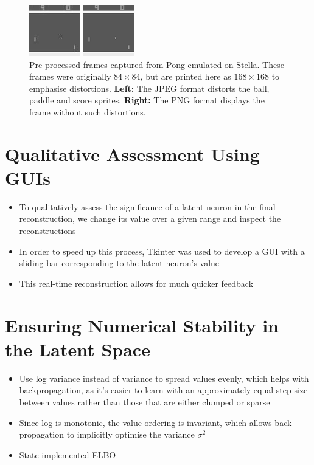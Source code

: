 \begin{figure}[h!]
\centering
\captionsetup{justification=centering}
\begin{multicols}{1}
    \includegraphics[scale=2.0]{figures/related_work/pong_729_pre_processed.jpeg}\par
    \includegraphics[scale=2.0]{figures/related_work/pong_729_pre_processed.png}\par
\end{multicols}
\caption{Pre-processed frames captured from Pong emulated on Stella. These frames were originally $84\times 84$, but are printed here as $168\times 168$ to emphasise distortions. \textbf{Left:} The JPEG format distorts the ball, paddle and score sprites. \textbf{Right:} The PNG format displays the frame without such distortions.}
\label{fig:pong_729_pre_processed}
\end{figure}


%
%
%
%
%
\section{Qualitative Assessment Using GUIs}
\begin{itemize}
\item To qualitatively assess the significance of a latent neuron in the final reconstruction, we change its value over a given range and inspect the reconstructions
\item In order to speed up this process, Tkinter was used to develop a GUI with a sliding bar corresponding to the latent neuron's value
\item This real-time reconstruction allows for much quicker feedback
\end{itemize}


%
%
%
%
%
\section{Ensuring Numerical Stability in the Latent Space}
\begin{itemize}
\item Use log variance instead of variance to spread values evenly, which helps with backpropagation, as it's easier to learn with an approximately equal step size between values rather than those that are either clumped or sparse
\item Since log is monotonic, the value ordering is invariant, which allows back propagation to implicitly optimise the variance $\sigma^2$
\item State implemented ELBO
\end{itemize}



